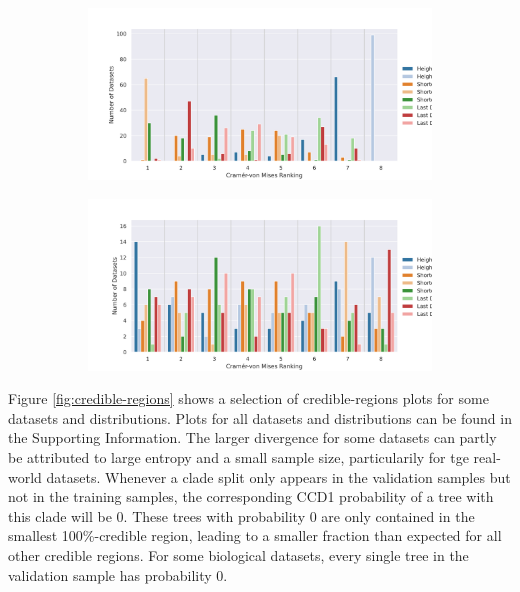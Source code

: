 \documentclass[10pt,letterpaper]{article}
\begin{document}
\begin{figure}[h!]
	\begin{subfigure}[b]{0.45\textwidth}
		\centering
		\includegraphics[width=\textwidth]{figures/yule-400-ccd1-cvm-ranking.png}
	\end{subfigure}
	\begin{subfigure}[b]{0.45\textwidth}
		\centering
		\includegraphics[width=\textwidth]{figures/bio-ccd1-cvm-ranking.png}
	\end{subfigure}
	
	\label{fig:cramer-von-mises-ranking}
\end{figure}

Figure \ref{fig:credible-regions} shows a selection of credible-regions plots for some datasets and distributions. Plots for all datasets and distributions can be found in the Supporting Information. The larger divergence for some datasets can partly be attributed to large entropy and a small sample size, particularily for tge real-world datasets. Whenever a clade split only appears in the validation samples but not in the training samples, the corresponding CCD1 probability of a tree with this clade will be $0$. These trees with probability $0$ are only contained in the smallest 100\%-credible region, leading to a smaller fraction than expected for all other credible regions. For some biological datasets, every single tree in the validation sample has probability $0$.
\end{document}
